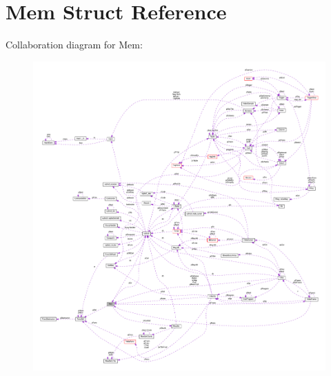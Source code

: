 \hypertarget{struct_mem}{\section{Mem Struct Reference}
\label{struct_mem}
}


Collaboration diagram for Mem\-:\nopagebreak
\begin{figure}[H]
\begin{center}
\leavevmode
\includegraphics[width=350pt]{struct_mem__coll__graph}
\end{center}
\end{figure}
